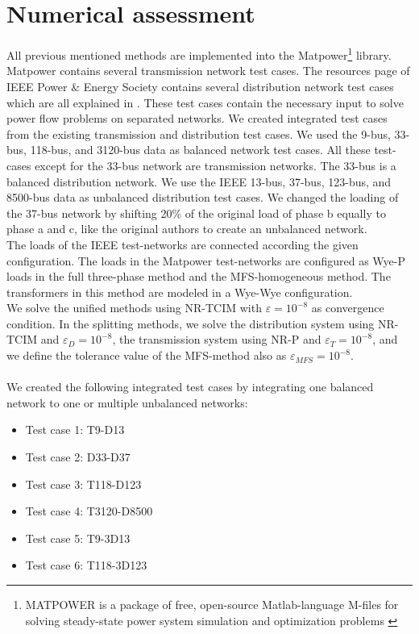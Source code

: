 \documentclass[10pt,journal]{article}
\begin{document}
\section{Numerical assessment}
All previous mentioned methods are implemented into the Matpower\footnote{MATPOWER is a package of free, open-source Matlab-language M-files for solving steady-state power system simulation and optimization problems \cite{Zimmerman2011}} library. Matpower contains several transmission network test cases. The resources page of IEEE Power \& Energy Society contains several distribution network test cases which are all explained in \cite{Schneider2018}. These test cases contain the necessary input to solve power flow problems on separated networks. We created integrated test cases from the existing transmission and distribution test cases. We used the 9-bus, 33-bus, 118-bus, and 3120-bus data as balanced network test cases. All these test-cases except for the 33-bus network are transmission networks. The 33-bus is a balanced distribution network. We use the IEEE 13-bus, 37-bus, 123-bus, and 8500-bus data as unbalanced distribution test cases. We changed the loading of the 37-bus network by shifting 20\% of the original load of phase b equally to phase a and c, like the original authors \cite{Taranto2008} to create an unbalanced network.\\ 
The loads of the IEEE test-networks are connected according the given configuration. The loads in the Matpower test-networks are configured as Wye-P loads in the full three-phase method and the MFS-homogeneous method. The transformers in this method are modeled in a Wye-Wye configuration.
\\ 
We solve the unified methods using NR-TCIM with $\varepsilon=10^{-8}$ as convergence condition. In the splitting methods, we solve the distribution system using NR-TCIM and $\varepsilon_D=10^{-8}$, the transmission system using NR-P and $\varepsilon_T=10^{-8}$, and we define the tolerance value of the MFS-method also as $\varepsilon_{MFS}=10^{-8}$.
\\ \\ 
We created the following integrated test cases by integrating one balanced network to one or multiple unbalanced networks: 
\begin{multicols}{2}
\begin{itemize}
    \item Test case 1: T9-D13
    \item Test case 2: D33-D37
    \item Test case 3: T118-D123
    \item Test case 4: T3120-D8500 
    \item Test case 5: T9-3D13 
    \item Test case 6: T118-3D123 
\end{itemize}
\end{multicols}
\end{document}
